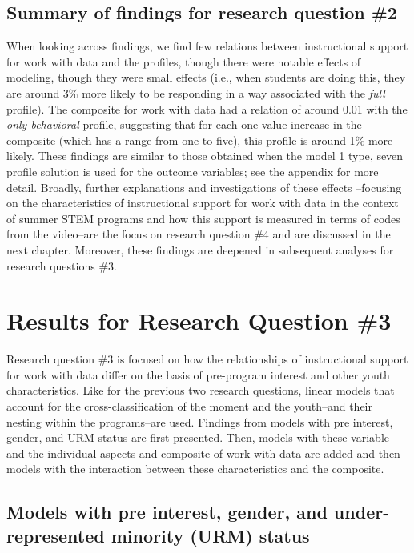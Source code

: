 \documentclass[]{msu-thesis}
\theoremstyle{definition}
\theoremstyle{definition}
\theoremstyle{definition}
\theoremstyle{remark}
\begin{document}
\subsection{Summary of findings for research question
\#2}\label{summary-of-findings-for-research-question-2}

When looking across findings, we find few relations between
instructional support for work with data and the profiles, though there
were notable effects of modeling, though they were small effects (i.e.,
when students are doing this, they are around 3\% more likely to be
responding in a way associated with the \emph{full} profile). The
composite for work with data had a relation of around 0.01 with the
\emph{only behavioral} profile, suggesting that for each one-value
increase in the composite (which has a range from one to five), this
profile is around 1\% more likely. These findings are similar to those
obtained when the model 1 type, seven profile solution is used for the
outcome variables; see the appendix for more detail. Broadly, further
explanations and investigations of these effects --focusing on the
characteristics of instructional support for work with data in the
context of summer STEM programs and how this support is measured in
terms of codes from the video--are the focus on research question \#4
and are discussed in the next chapter. Moreover, these findings are
deepened in subsequent analyses for research questions \#3.

\section{Results for Research Question
\#3}\label{results-for-research-question-3}

Research question \#3 is focused on how the relationships of
instructional support for work with data differ on the basis of
pre-program interest and other youth characteristics. Like for the
previous two research questions, linear models that account for the
cross-classification of the moment and the youth--and their nesting
within the programs--are used. Findings from models with pre interest,
gender, and URM status are first presented. Then, models with these
variable and the individual aspects and composite of work with data are
added and then models with the interaction between these characteristics
and the composite.

\subsection{Models with pre interest, gender, and under-represented
minority (URM)
status}\label{models-with-pre-interest-gender-and-under-represented-minority-urm-status}
\end{document}
